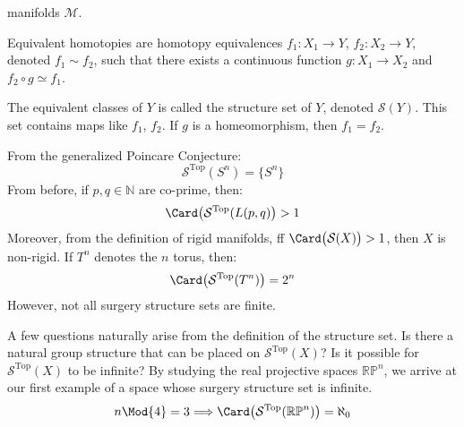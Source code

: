 \documentclass[crop=false,class=book,oneside]{standalone}                      %
\begin{document}
            manifolds $\mathcal{M}$.
            \begin{definition}
                Equivalent homotopies are homotopy equivalences
                $f_{1}:X_{1}\rightarrow Y$,
                $f_{2}:X_{2}\rightarrow Y$,
                denoted $f_{1}\sim{f_{2}}$, such that there
                exists a continuous function
                $g:X_{1}\rightarrow{X_{2}}$ and
                $f_{2}\circ{g}\simeq{f_{1}}$.
            \end{definition}
            The equivalent classes of $Y$ is called the
            structure set of $Y$,
            denoted $\mathcal{S}(Y)$. This set contains maps
            like $f_{1}$, $f_{2}$.
            If $g$ is a homeomorphism, then $f_{1}=f_{2}$.
            \begin{lexample}
                From the generalized Poincare Conjecture:
                \begin{equation}
                    \mathcal{S}^{\textrm{Top}}(S^{n})
                    =\{S^{n}\}
                \end{equation}
                From before, if $p,q\in\mathbb{N}$ are co-prime, then:
                \begin{equation}
                    \Card\big(\mathcal{S}^{\textrm{Top}}(L(p,q)\big)>1
                \end{equation}
                Moreover, from the definition of rigid manifolds,
                ff $\Card\big(\mathcal{S}(X)\big)>1$, then $X$ is non-rigid.
                If $T^{n}$ denotes the $n$ torus, then:
                \begin{equation}
                    \Card\big(\mathcal{S}^{\textrm{Top}}(T^{n})\big)
                    =2^{n}
                \end{equation}
                However, not all surgery structure sets are finite.
            \end{lexample}
            A few questions naturally arise from the
            definition of the structure set. Is there a natural group
            structure that can be placed on $\mathcal{S}^{\textrm{Top}}(X)$?
            Is it possible for $\mathcal{S}^{\textrm{Top}}(X)$ to be infinite?
            By studying the real projective spaces $\mathbb{RP}^{n}$, we
            arrive at our first example of a space whose surgery structure
            set is infinite.
            \begin{equation}
                n\Mod{4}=3
                \Longrightarrow
                \Card\big(\mathcal{S}^{\textrm{Top}}(\mathbb{RP}^{n})\big)
                =\aleph_{0}
            \end{equation}
\end{document}
